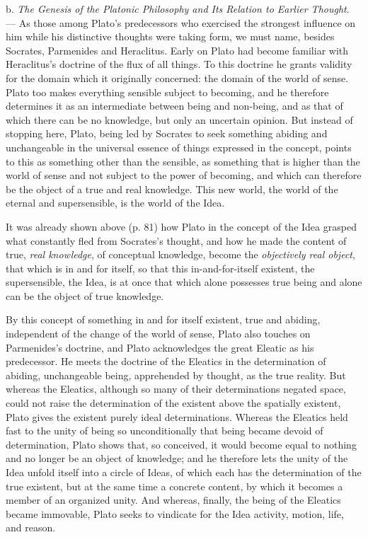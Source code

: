 b. \emph{The Genesis of the Platonic Philosophy and Its Relation to Earlier
Thought}. --- As those among Plato's predecessors who exercised the
strongest influence on him while his distinctive thoughts were taking form,
we must name, besides Socrates, Parmenides and Heraclitus. Early on Plato
had become familiar with Heraclitus's doctrine of the flux of all things. To
this doctrine he grants validity for the domain which it
originally concerned: the domain of the world of sense. Plato too makes
everything sensible subject to becoming, and he therefore determines it as
an intermediate between being and non-being, and as that of which there can
be no knowledge, but only an uncertain opinion. But instead of stopping
here, Plato, being led by Socrates to seek something abiding and
unchangeable in the universal essence of things expressed in the concept,
points to this as something other than the sensible, as something that is
higher than the world of sense and not subject to the power of becoming, and
which can therefore be the object of a true and real knowledge. This new
world, the world of the eternal and supersensible, is the world of the Idea.

It was already shown above (p. 81) how Plato in the concept of the Idea
grasped what constantly fled from Socrates's thought, and how he made the
content of true, \emph{real knowledge}, of conceptual knowledge, become the
\emph{objectively real object}, that which is in and for itself, so that this
in-and-for-itself existent, the supersensible, the Idea, is at once that
which alone possesses true being and alone can be the object of true
knowledge.

By this concept of something in and for itself existent, true and abiding,
independent of the change of the world of sense, Plato also touches on
Parmenides's doctrine, and Plato acknowledges the great Eleatic as his
predecessor. He meets the doctrine of the Eleatics in the determination of
abiding, unchangeable being, apprehended by thought, as the true reality.
But whereas the Eleatics, although so many of their determinations negated
space, could not raise the determination of the existent above the
spatially existent, Plato gives the existent purely ideal determinations.
Whereas the Eleatics held fast to the unity of being so unconditionally that
being became devoid of determination, Plato shows that, so conceived, it
would become equal to nothing and no longer be an object of knowledge; and
he therefore lets the unity of the Idea unfold itself into a circle of
Ideas, of which each has the determination of the true existent,
but at the same time a concrete content, by which it becomes a member of an
organized unity. And whereas, finally, the being of the Eleatics became
immovable, Plato seeks to vindicate for the Idea activity, motion, life,
and reason.

